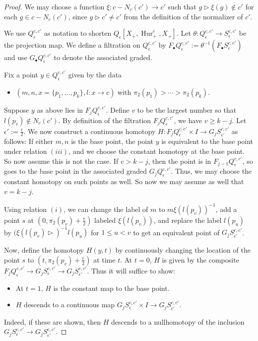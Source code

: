 \documentclass[12 pt]{amsart}
\theoremstyle{plain}
\theoremstyle{definition}
\theoremstyle{remark}
\numberwithin{equation}{section}
\DeclareMathOperator\Hur{Hur}
\begin{document}
\begin{proof}
We may choose a function
$\xi:c-N_c(c') \to c'$ such that 
$g\triangleright \xi(g) \notin c'$ for each $g \in c-N_c(c')$, since $g\triangleright c' \neq c'$
from the definition of the normalizer of $c'$.

We use ${Q}_{\epsilon}^{c,c'}$ as notation to shorten ${Q}_{\epsilon}[X_+,\Hur^{c}_+,X_+]$.
Let $\theta:{Q}_{\epsilon}^{c,c'}\to S_{\epsilon}^{c,c'}$ be the projection map.
We define a filtration on $Q^{c,c'}_{\epsilon}$ by $F_\bullet Q^{c,c'}_{\epsilon} :=
\theta^{-1}(F_\bullet S^{c,c'}_{\epsilon})$ and use $G_{\bullet}Q^{c,c'}_{\epsilon}$ to denote the associated graded.

Fix a point $y \in Q^{c,c'}_{\epsilon}$ given by the data \begin{itemize}
	\item[$(\dagger)$] $(m,n,x = \{p_1, \ldots, p_k\},l:x \to c)$ with $\pi_2(p_1)> \cdots > \pi_2(p_k)$. 
\end{itemize} 

Suppose $y$ as above lies in $F_jQ_{\epsilon}^{c,c'}$. Define $v$ to be the largest number
so that $l(p_v) \notin N_c(c')$. By definition of the filtration $F_j Q_{\epsilon}^{c,c'}$, we have $v\geq k-j$.
	Let $\epsilon' := \frac {\epsilon}{2}$.
	We now construct a continuous homotopy $H : F_jQ^{c,c'}_\epsilon  \times I \to
	G_j S^{c,c'}_{\epsilon'}$ %
	as follows:
	If either $m,n$ is the base point, the point $y$ is equivalent to the
	base point under relation $(iii)$, and we choose the constant homotopy
	at the base point. So now assume this is not the case. If $v>k-j$, then
	the point is in $F_{j-1}Q_{\epsilon}^{c,c'}$, so goes to the base point in the
	associated graded $G_j Q_{\epsilon}^{c,c'}$. Thus, we may choose the constant homotopy on such points as well. So now we may assume as well that $v=k-j$.
	
	Using relation $(i)$, we can
	change the label of $m$ to $m \xi(l(p_v))^{-1}$, add a point $s$ at $(0,
	\pi_2(p_v)+\frac {\epsilon} {2})$ labeled
	$\xi(l(p_v))$, 
	and replace the label $l(p_u)$ by $(\xi(l(p_v) \triangleright)^{-1}
		l(p_u)$ for $1 \leq u < v$
	to get an equivalent point of $G_jS_{\epsilon'}^{c,c'}$. 

	Now, define the homotopy $H(y,t)$ by continuously changing the location of the point $s$ to $(t,
	\pi_2(p_v)+\frac {\epsilon} {2})$ at time $t$.
	At $t=0$, $H$ is given by the composite $F_j Q_{\epsilon}^{c,c'}\rightarrow G_j
	S_{\epsilon}^{c,c'} \rightarrow G_j
	S_{\epsilon'}^{c,c'}$. Thus it will suffice to show:
\begin{itemize}
	\item[(1)] At $t=1$, $H$ is the constant map to the base point.
	\item[(2)] $H$ descends to a continuous map
		$G_j S^{c,c'}_\epsilon \times I \to
		G_j S^{c,c'}_{\epsilon'}$.
\end{itemize}
Indeed, if these are shown, then $H$ descends to a nullhomotopy of the inclusion
$G_j S^{c,c'}_{\epsilon} \to G_j
S^{c,c'}_{\epsilon'}$. 


\end{proof}
\end{document}
